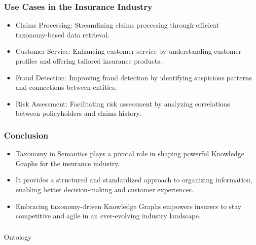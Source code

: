 \begin{frame}[fragile]
\frametitle{Use Cases in the Insurance Industry}
\begin{itemize}
\item Claims Processing: Streamlining claims processing through efficient taxonomy-based data retrieval.
\item Customer Service: Enhancing customer service by understanding customer profiles and offering tailored insurance products.
\item Fraud Detection: Improving fraud detection by identifying suspicious patterns and connections between entities.
\item Risk Assessment: Facilitating risk assessment by analyzing correlations between policyholders and claims history.
\end{itemize}
\end{frame}

\begin{frame}[fragile]
\frametitle{Conclusion}
\begin{itemize}
\item Taxonomy in Semantics plays a pivotal role in shaping powerful Knowledge Graphs for the insurance industry.
\item It provides a structured and standardized approach to organizing information, enabling better decision-making and customer experiences.
\item Embracing taxonomy-driven Knowledge Graphs empowers insurers to stay competitive and agile in an ever-evolving industry landscape.
\end{itemize}
\end{frame}


\begin{frame}[fragile]\frametitle{}
\begin{center}
{\Large Ontology }
\end{center}
\end{frame}

